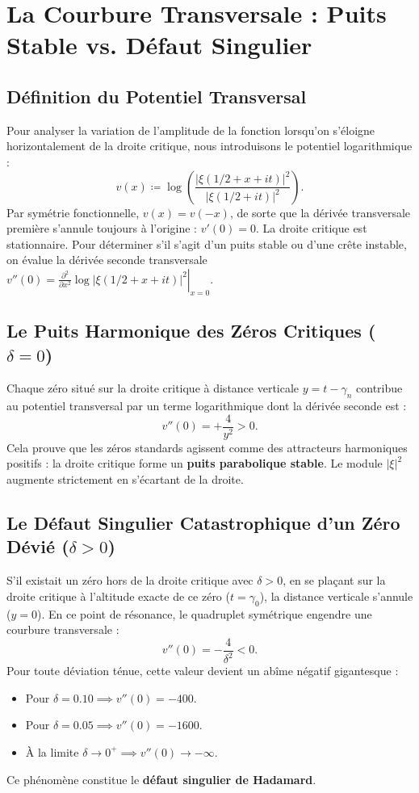 \documentclass[11pt,a4paper]{article}
\theoremstyle{definition}
\theoremstyle{remark}
\begin{document}
\section{La Courbure Transversale : Puits Stable vs. Défaut Singulier}

\subsection{Définition du Potentiel Transversal}
Pour analyser la variation de l'amplitude de la fonction lorsqu'on s'éloigne horizontalement de la droite critique, nous introduisons le potentiel logarithmique :
\begin{equation}
v(x) \coloneqq \log \left(\frac{|\xi(1/2 + x + it)|^2}{|\xi(1/2 + it)|^2}\right).
\end{equation}
Par symétrie fonctionnelle, $v(x) = v(-x)$, de sorte que la dérivée transversale première s'annule toujours à l'origine : $v'(0) = 0$. La droite critique est stationnaire. Pour déterminer s'il s'agit d'un puits stable ou d'une crête instable, on évalue la dérivée seconde transversale $v''(0) = \left.\frac{\partial^2}{\partial x^2}\log |\xi(1/2 + x + it)|^2\right|_{x=0}$.

\subsection{Le Puits Harmonique des Zéros Critiques (\texorpdfstring{$\delta = 0$}{delta = 0})}
Chaque zéro situé sur la droite critique à distance verticale $y = t - \gamma_n$ contribue au potentiel transversal par un terme logarithmique dont la dérivée seconde est :
\begin{equation}
v''(0) = +\frac{4}{y^2} > 0.
\end{equation}
Cela prouve que les zéros standards agissent comme des attracteurs harmoniques positifs : la droite critique forme un \textbf{puits parabolique stable}. Le module $|\xi|^2$ augmente strictement en s'écartant de la droite.

\subsection{Le Défaut Singulier Catastrophique d'un Zéro Dévié (\texorpdfstring{$\delta > 0$}{delta > 0})}
S'il existait un zéro hors de la droite critique avec $\delta > 0$, en se plaçant sur la droite critique à l'altitude exacte de ce zéro ($t = \gamma_0$), la distance verticale s'annule ($y = 0$). En ce point de résonance, le quadruplet symétrique engendre une courbure transversale :
\begin{equation}
v''(0) = -\frac{4}{\delta^2} < 0.
\end{equation}
Pour toute déviation ténue, cette valeur devient un abîme négatif gigantesque :
\begin{itemize}
    \item Pour $\delta = 0.10 \implies v''(0) = -400$.
    \item Pour $\delta = 0.05 \implies v''(0) = -1600$.
    \item À la limite $\delta \to 0^+ \implies v''(0) \to -\infty$.
\end{itemize}
Ce phénomène constitue le \textbf{défaut singulier de Hadamard}.
\end{document}

